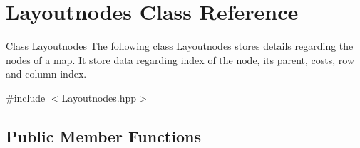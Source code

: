 \hypertarget{classLayoutnodes}{}\section{Layoutnodes Class Reference}
\label{classLayoutnodes}


Class \hyperlink{classLayoutnodes}{Layoutnodes} The following class \hyperlink{classLayoutnodes}{Layoutnodes} stores details regarding the nodes of a map. It store data regarding index of the node, its parent, costs, row and column index.  




{\ttfamily \#include $<$Layoutnodes.\+hpp$>$}

\subsection*{Public Member Functions}
